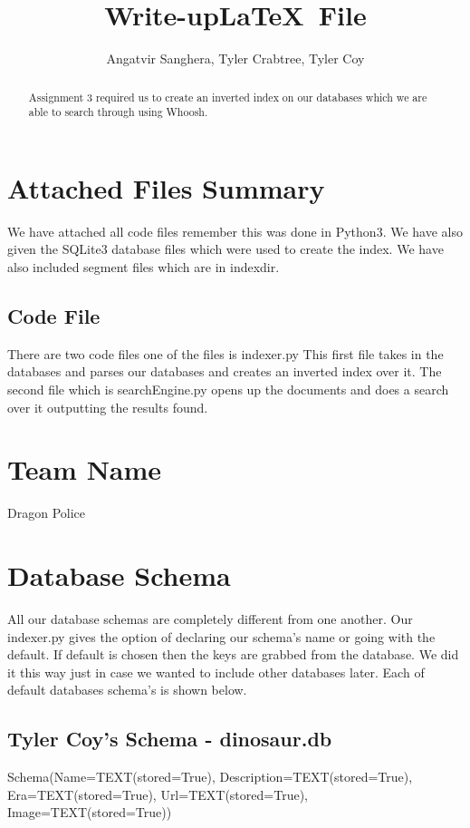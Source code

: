\documentclass[]{article}
\begin{document}
\title{Write-up\LaTeX ~File}
\author{Angatvir Sanghera, Tyler Crabtree, Tyler Coy
}
\maketitle

\begin{abstract}
Assignment 3 required us to create an inverted index on our databases which we are able to search through using Whoosh.  
\end{abstract}


\section{Attached Files Summary}
We have attached all code files remember this was done in Python3. We have also given the SQLite3 database files which were used to create the index. We have also included segment files which are in indexdir.
\subsection{Code File}
There are two code files one of the files is indexer.py This first file takes in the databases and parses our databases and creates an inverted index over it. The second file which is searchEngine.py opens up the documents and does a search over it outputting the results found. 

\section{Team Name}
Dragon Police

\section{Database Schema}
All our database schemas are completely different from one another. Our indexer.py gives the option of declaring our schema's name or going with the default. If default is chosen then the keys are grabbed from the database. We did it this way just in case we wanted to include other databases later. Each of default databases schema's is shown below.
\subsection{Tyler Coy's Schema - dinosaur.db}
Schema(Name=TEXT(stored=True), Description=TEXT(stored=True), Era=TEXT(stored=True), Url=TEXT(stored=True), Image=TEXT(stored=True))
\end{document}
